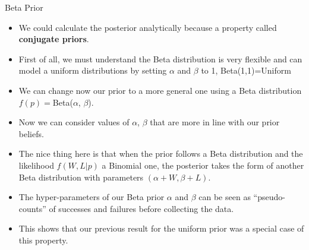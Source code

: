\documentclass[handout]{beamer}
\begin{document}
\begin{frame}{Beta Prior}
\scriptsize{

\begin{itemize}

\item We could calculate the posterior analytically because a property called \textbf{conjugate priors}.

\item First of all, we must understand the Beta distribution is very flexible and can model a uniform distributions by setting $\alpha$ and $\beta$ to 1,  Beta(1,1)=Uniform

\item We can change now our prior to a more general one using a Beta distribution $f(p)=$Beta($\alpha$, $\beta$).

\item Now we can consider values of $\alpha$, $\beta$ that are more in line with our prior beliefs.

\item The nice thing here is that when the prior follows a Beta distribution  and the likelihood $f(W,L|p)$ a Binomial one, the posterior takes the form of another Beta distribution with parameters $(\alpha+W,\beta+L)$.

\item  The hyper-parameters of our Beta prior $\alpha$ and $\beta$  can be seen as ``pseudo-counts'' of successes and failures before collecting the data.  

\item This shows that our previous result for the uniform prior was a special case of this property.

\end{itemize}

} 

\end{frame}
\end{document}

